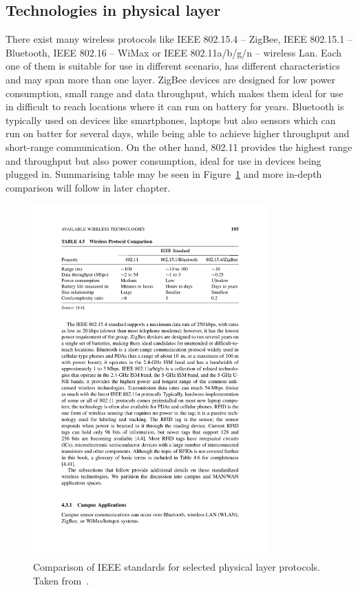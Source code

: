 \subsection{Technologies in physical layer}

There exist many wireless protocols like IEEE 802.15.4 – ZigBee, IEEE 802.15.1 – Bluetooth, IEEE 802.16 – WiMax or IEEE 802.11a/b/g/n – wireless Lan. Each one of them is suitable for use in different scenario, has different characteristics and may span more than one layer. ZigBee devices are designed for low power consumption, small range and data throughput, which makes them ideal for use in difficult to reach locations where it can run on battery for years. Bluetooth is typically used on devices like smartphones, laptops but also sensors which can run on batter for several days, while being able to achieve higher throughput and short-range communication. On the other hand, 802.11 provides the highest range and throughput but also power consumption, ideal for use in devices being plugged in. Summarising table may be seen in Figure~\ref{fig:protocol-comparison} and more in-depth comparison will follow in later chapter.

\begin{figure}
    \centering
    \includegraphics[width=0.8\textwidth]{00images/protocol-comparison}
    \caption{Comparison of IEEE standards for selected physical layer protocols. Taken from~\cite{Sohraby2007WirelessApplications}.}
    \label{fig:protocol-comparison}
\end{figure}